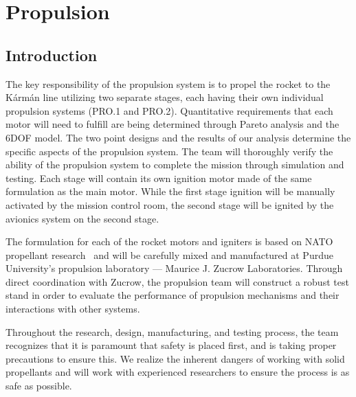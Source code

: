 \section{Propulsion} \label{section:propulsion}
\subsection{Introduction}

The key responsibility of the propulsion system is to propel the rocket to the K\'{a}rm\'{a}n line utilizing two separate stages, each having their own individual propulsion systems (PRO.1 and PRO.2). Quantitative requirements that each motor will need to fulfill are being determined through Pareto analysis and the 6DOF model. The two point designs and the results of our analysis determine the specific aspects of the propulsion system. The team will thoroughly verify the ability of the propulsion system to complete the mission through simulation and testing. Each stage will contain its own ignition motor made of the same formulation as the main motor. While the first stage ignition will be manually activated by the mission control room, the second stage will be ignited by the avionics system on the second stage.

The formulation for each of the rocket motors and igniters is based on NATO propellant research~\cite{butacene} and will be carefully mixed and manufactured at Purdue University's propulsion laboratory --- Maurice J. Zucrow Laboratories. Through direct coordination with Zucrow, the propulsion team will construct a robust test stand in order to evaluate the performance of propulsion mechanisms and their interactions with other systems.

Throughout the research, design, manufacturing, and testing process, the team recognizes that it is paramount that safety is placed first, and is taking proper precautions to ensure this. We realize the inherent dangers of working with solid propellants and will work with experienced researchers to ensure the process is as safe as possible.


